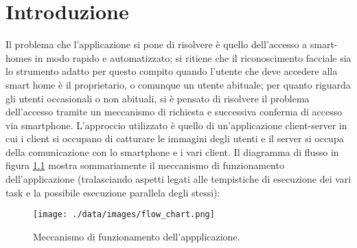 \chapter{Introduzione}

Il problema che l'applicazione si pone di risolvere è quello dell'accesso a smart-homes in modo rapido e automatizzato; si ritiene che il riconoscimento facciale sia lo strumento adatto per questo compito quando l'utente che deve accedere alla smart home è il proprietario, o comunque un utente abituale; per quanto riguarda gli utenti occasionali o non abituali, si è pensato di risolvere il problema dell'accesso tramite un meccanismo di richiesta e successiva conferma di accesso via smartphone. L'approccio utilizzato è quello di un'applicazione client-server in cui i client si occupano di catturare le immagini degli utenti e il server si occupa della comunicazione con lo smartphone e i vari client. Il diagramma di flusso in figura \ref{flow_chart} mostra sommariamente il meccanismo di funzionamento dell'applicazione (tralasciando aspetti legati alle tempistiche di esecuzione dei vari task e la possibile esecuzione parallela degli stessi):
\begin{figure}
	\centering
	\texttt{[image: ./data/images/flow\_chart.png]}
	\caption{Meccanismo di funzionamento dell'appplicazione.}
	\label{flow_chart}
\end{figure}